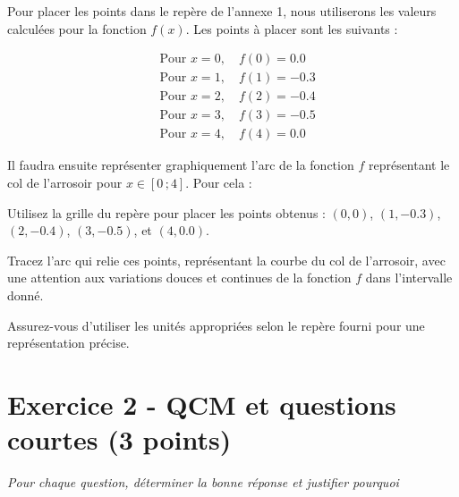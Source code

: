 \documentclass[answers]{exam}
\begin{document}
\begin{solution}
Pour placer les points dans le repère de l'annexe 1, nous utiliserons les valeurs calculées pour la fonction $f(x)$. Les points à placer sont les suivants : 

\begin{align*}
  &\text{Pour } x = 0, \quad f(0) = 0.0 \\
  &\text{Pour } x = 1, \quad f(1) = -0.3 \\
  &\text{Pour } x = 2, \quad f(2) = -0.4 \\
  &\text{Pour } x = 3, \quad f(3) = -0.5 \\
  &\text{Pour } x = 4, \quad f(4) = 0.0
\end{align*}

Il faudra ensuite représenter graphiquement l'arc de la fonction $f$ représentant le col de l'arrosoir pour $x \in [0\,;4]$. Pour cela : 
\begin{compactitem}
  \item Utilisez la grille du repère pour placer les points obtenus : $(0, 0)$, $(1, -0.3)$, $(2, -0.4)$, $(3, -0.5)$, et $(4, 0.0)$.
  \item Tracez l'arc qui relie ces points, représentant la courbe du col de l'arrosoir, avec une attention aux variations douces et continues de la fonction $f$ dans l'intervalle donné.
\end{compactitem}

Assurez-vous d'utiliser les unités appropriées selon le repère fourni pour une représentation précise.
\end{solution}

\section*{Exercice 2 - QCM et questions courtes (3 points)}

\emph{Pour chaque question, déterminer la bonne réponse et justifier pourquoi}
\end{document}

